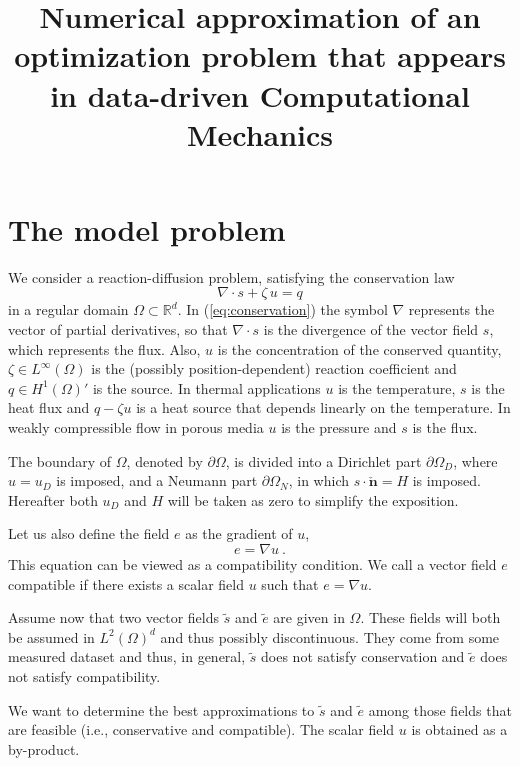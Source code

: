\documentclass{article}
\title{Numerical approximation of an optimization problem that appears in  data-driven Computational Mechanics}
\begin{document}
\maketitle

\section{The model problem}

We consider a reaction-diffusion problem, satisfying the conservation law
\begin{equation}
\nabla \cdot s + \zeta\,u = q
\label{eq:conservation}
\end{equation}
in a regular domain $\Omega \subset \mathbb{R}^d$. In (\ref{eq:conservation}) the symbol $\nabla$ represents the vector of partial derivatives, so that $\nabla \cdot s$ is the divergence of the vector field $s$, which represents the flux. Also, $u$ is the concentration of the conserved quantity, $\zeta\in L^{\infty}(\Omega)$ is the (possibly position-dependent) reaction coefficient and $q\in H^1(\Omega)'$ is the source. In thermal applications $u$ is the temperature, $s$ is the heat flux and $q-\zeta u$ is a heat source that depends linearly on the temperature. In weakly compressible flow in porous media $u$ is the pressure and $s$ is the flux.

The boundary of $\Omega$, denoted by $\partial \Omega$, is divided into a Dirichlet part $\partial \Omega_D$, where $u=u_D$ is imposed, and a Neumann part $\partial\Omega_N$, in which $s\cdot \mathbf{\check{n}}=H$ is imposed. Hereafter both $u_D$ and $H$ will be taken as zero to simplify the exposition. 

Let us also define the field $e$ as the gradient of $u$,
\begin{equation}
e = \nabla u~.
\label{eq:compatibility}
\end{equation}
This equation can be viewed as a compatibility condition. We call a vector field $e$ compatible if there exists a scalar field $u$ such that $e=\nabla u$.

Assume now that two vector fields $\tilde{s}$ and $\tilde{e}$ are given in $\Omega$. These fields will both be assumed in $L^2(\Omega)^d$ and thus possibly discontinuous. They come from some measured dataset and thus, in general,  
$\tilde{s}$ does not satisfy conservation and $\tilde{e}$ does not satisfy compatibility.

We want to determine the best approximations to $\tilde{s}$ and $\tilde{e}$ among those fields that are feasible (i.e., conservative and compatible). The scalar field $u$ is obtained as a by-product.
\end{document}
